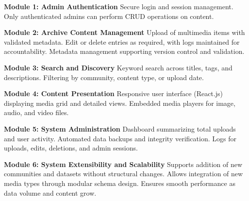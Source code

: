 \begin{outline}
  \1 \textbf{Module 1: Admin Authentication}
    \2 Secure login and session management.
    \2 Only authenticated admins can perform CRUD operations on content.

  \1 \textbf{Module 2: Archive Content Management}
    \2 Upload of multimedia items with validated metadata.
    \2 Edit or delete entries as required, with logs maintained for accountability.
    \2 Metadata management supporting version control and validation.

  \1 \textbf{Module 3: Search and Discovery}
    \2 Keyword search across titles, tags, and descriptions.
    \2 Filtering by community, content type, or upload date.

  \1 \textbf{Module 4: Content Presentation}
    \2 Responsive user interface (React.js) displaying media grid and detailed views.
    \2 Embedded media players for image, audio, and video files.

  \1 \textbf{Module 5: System Administration}
    \2 Dashboard summarizing total uploads and user activity.
    \2 Automated data backups and integrity verification.
    \2 Logs for uploads, edits, deletions, and admin sessions.
    
  \1 \textbf{Module 6: System Extensibility and Scalability}
    \2 Supports addition of new communities and datasets without structural changes.
    \2 Allows integration of new media types through modular schema design.
    \2 Ensures smooth performance as data volume and content grow.


\end{outline}


